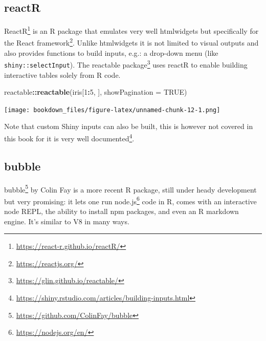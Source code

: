 \documentclass[
]{krantz}
\makeatletter
\newenvironment{Shaded}{\begin{snugshade}}{\end{snugshade}}
\newcommand{\CommentTok}[1]{\textcolor[rgb]{0.37,0.37,0.37}{\textit{#1}}}
\newcommand{\DataTypeTok}[1]{\textcolor[rgb]{0.27,0.27,0.27}{#1}}
\newcommand{\DecValTok}[1]{\textcolor[rgb]{0.06,0.06,0.06}{#1}}
\newcommand{\KeywordTok}[1]{\textcolor[rgb]{0.27,0.27,0.27}{\textbf{#1}}}
\newcommand{\NormalTok}[1]{#1}
\newcommand{\OperatorTok}[1]{\textcolor[rgb]{0.43,0.43,0.43}{\textbf{#1}}}
\newcommand{\OtherTok}[1]{\textcolor[rgb]{0.37,0.37,0.37}{#1}}
\newcommand{\StringTok}[1]{\textcolor[rgb]{0.5,0.5,0.5}{#1}}
\renewcommand{\href}[2]{#2\footnote{\url{#1}}}
\newenvironment{kframe}{%
\medskip{}
\setlength{\fboxsep}{.8em}
 \def\at@end@of@kframe{}%
 \ifinner\ifhmode%
  \def\at@end@of@kframe{\end{minipage}}%
  \begin{minipage}{\columnwidth}%
 \fi\fi%
 \def\FrameCommand##1{\hskip\@totalleftmargin \hskip-\fboxsep
 \colorbox{shadecolor}{##1}\hskip-\fboxsep
     \hskip-\linewidth \hskip-\@totalleftmargin \hskip\columnwidth}%
 \MakeFramed {\advance\hsize-\width
   \@totalleftmargin\z@ \linewidth\hsize
   \@setminipage}}%
 {\par\unskip\endMakeFramed%
 \at@end@of@kframe}
\renewenvironment{Shaded}{\begin{kframe}}{\end{kframe}}
\makeatother
\begin{document}
\hypertarget{reactr}{%
\subsection*{reactR}\label{reactr}}


\href{https://react-r.github.io/reactR/}{ReactR} \citep{R-reactR} is an R package that emulates very well htmlwidgets but specifically for the \href{https://reactjs.org/}{React framework}. Unlike htmlwidgets it is not limited to visual outputs and also provides functions to build inputs, e.g.: a drop-down menu (like \texttt{shiny::selectInput}). The \href{https://glin.github.io/reactable/}{reactable package} \citep{R-reactable} uses reactR to enable building interactive tables solely from R code.

\begin{Shaded}
\begin{Highlighting}[]
\NormalTok{reactable}\OperatorTok{::}\KeywordTok{reactable}\NormalTok{(iris[}\DecValTok{1}\OperatorTok{:}\DecValTok{5}\NormalTok{, ], }\DataTypeTok{showPagination =} \OtherTok{TRUE}\NormalTok{)}
\end{Highlighting}
\end{Shaded}

\texttt{[image: bookdown\_files/figure-latex/unnamed-chunk-12-1.png]}

Note that custom Shiny inputs can also be built, this is however not covered in this book for it is very well \href{https://shiny.rstudio.com/articles/building-inputs.html}{documented}.

\hypertarget{bubble}{%
\subsection*{bubble}\label{bubble}}


\href{https://github.com/ColinFay/bubble}{bubble} \citep{R-bubble} by Colin Fay is a more recent R package, still under heady development but very promising: it lets one run \href{https://nodejs.org/en/}{node.js} code in R, comes with an interactive node REPL, the ability to install npm packages, and even an R markdown engine. It's similar to V8 in many ways.

\begin{Shaded}
\end{Shaded}
\end{document}
